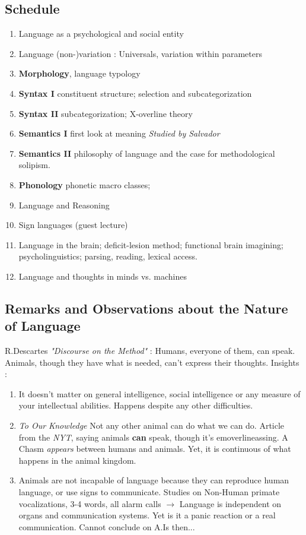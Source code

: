 \documentclass{cours}
\begin{document}
\subsection*{Schedule}
\begin{enumerate}
    \item Language as a psychological and social entity
    \item Language (non-)variation\! : Universals, variation within parameters
    \item \textbf{Morphology}, language typology
    \item \textbf{Syntax I} constituent structure; selection and subcategorization
    \item \textbf{Syntax II} subcategorization; X-overline theory
    \item \textbf{Semantics I} first look at meaning \textsl{Studied by Salvador}
    \item \textbf{Semantics II} philosophy of language and the case for methodological solipism.
    \item \textbf{Phonology} phonetic macro classes;
    \item Language and Reasoning
    \item Sign languages (guest lecture)
    \item Language in the brain; deficit-lesion method; functional brain imagining; psycholinguistics; parsing, reading, lexical access.
    \item Language and thoughts in minds vs. machines
\end{enumerate}

\subsection{Remarks and Observations about the Nature of Language}
R.Descartes \textit{"Discourse on the Method"}\! : Humans, everyone of them, can speak. Animals, though they have what is needed, can't express their thoughts.
Insights\! :
\begin{enumerate}
    \item It doesn't matter on general intelligence, social intelligence or any measure of your intellectual abilities. Happens despite any other difficulties.
    \item \emph{To Our Knowledge} Not any other animal can do what we can do. Article from the \textit{NYT}, saying animals \textbf{can} speak, though it's emoverlineassing. A Chasm \textit{appears} between humans and animals. Yet, it is continuous of what happens in the animal kingdom.
    \item Animals are not incapable of language because they can reproduce human language, or use signs to communicate. Studies on Non-Human primate vocalizations, 3-4 words, all alarm calls $\rightarrow$ Language is independent on organs and communication systems. Yet is it a panic reaction or a real communication. Cannot conclude on A.Is then...
\end{enumerate}
\end{document}
